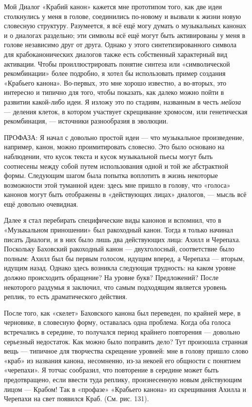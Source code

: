 \documentclass[../main.tex]{subfiles}
\begin{document}
Мой Диалог «Крабий канон» кажется мне прототипом того, как две идеи столкнулись у меня в голове, соединились по-новому и вызвали к жизни новую словесную структуру. Разумеется, я всё ещё могу думать о музыкальных канонах и о диалогах раздельно; эти символы всё ещё могут быть активированы у меня в голове независимо друг от друга. Однако у этого синтетизированного символа для крабоканонических диалогов также есть собственный характерный вид активации. Чтобы проиллюстрировать понятие синтеза или «символической рекомбинации» более подробно, я хотел бы использовать пример создания «Крабьего канона». Во-первых, это мне хорошо известно, а во-вторых, это интересно и типично для того, чтобы показать, как далеко можно пойти в развитии какой-либо идеи. Я изложу это по стадиям, названным в честь \emph{мейоза} --- деления клеток, в котором участвует скрещивание хромосом, или генетическая рекомбинация, --- источники разнообразия в эволюции.

ПРОФАЗА: Я начал с довольно простой идеи --- что музыкальное произведение, например, канон, можно проимитировать словесно. Это было основано на наблюдении, что кусок текста и кусок музыкальной пьесы могут быть соотнесены между собой путем использования одной и той же абстрактной формы. Следующим шагом была попытка воплотить в жизнь некоторые возможности этой туманной идеи: здесь мне пришло в голову, что «голоса» канонов могут быть отображены в «действующих лицах» диалогов, --- мысль всё ещё довольно очевидная.

Далее я стал перебирать специфические виды канонов и вспомнил, что в «Музыкальном приношении» был ракоходный канон. Тогда я только начинал писать Диалоги, и в них было лишь два действующих лица: Ахилл и Черепаха. Поскольку Баховский ракоходный канон --- двухголосный, соответствие было полным: Ахилл был бы первым голосом, идущим вперед, а Черепаха --- вторым, идущим назад. Однако здесь возникла следующая трудность: на каком уровне должно происходить обращение? На уровне букв? Предложений? После некоторого раздумья я заключил, что самым подходящим является уровень реплик, то есть драматического действия.

После того, как «скелет» Баховского канона был переведен, по крайней мере, в черновике, в словесную форму, оставалась одна проблема. Когда оба голоса встречались в середине, то получался период крайнего повторения --- довольно серьезный недостаток. Как можно было поправить дело? Тут произошла странная вещь --- типичное для творчества скрещение уровней: мне в голову пришло слово «краб» из названия канона, несомненно, из-за некоей его общности с понятием «черепахи». Я тотчас сообразил, что повторение в середине может быть предотвращено, если ввести туда реплику, произнесенную новым действующим лицом --- Крабом! Так в «профазе» «Крабьего канона» из скрещивания Ахилла и Черепахи на свет появился Краб. (См. рис. 131).
\end{document}
